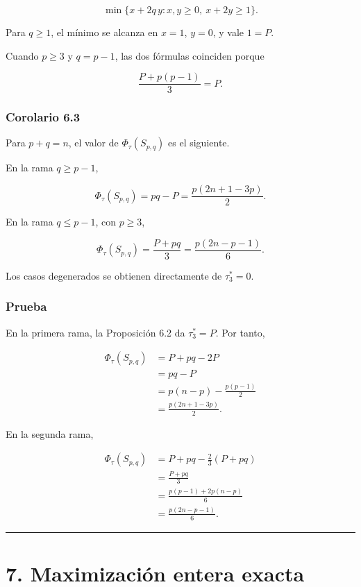 \documentclass[
  11pt,
]{article}
\begin{document}
\[
\min\{x+2q\,y:x,y\ge0,\ x+2y\ge1\}.
\]

Para \(q\ge1\), el mínimo se alcanza en \(x=1\), \(y=0\), y vale
\(1=P\).

Cuando \(p\ge3\) y \(q=p-1\), las dos fórmulas coinciden porque

\[
\frac{P+p(p-1)}{3}=P.
\]

\subsubsection{Corolario 6.3}\label{corolario-6.3}

Para \(p+q=n\), el valor de \(\Phi_\tau(S_{p,q})\) es el siguiente.

En la rama \(q\ge p-1\),

\[
\Phi_\tau(S_{p,q})
=
pq-P
=
\frac{p(2n+1-3p)}2.
\tag{6.1}
\]

En la rama \(q\le p-1\), con \(p\ge3\),

\[
\Phi_\tau(S_{p,q})
=
\frac{P+pq}{3}
=
\frac{p(2n-p-1)}6.
\tag{6.2}
\]

Los casos degenerados se obtienen directamente de \(\tau_3^*=0\).

\subsubsection{Prueba}\label{prueba-10}

En la primera rama, la Proposición 6.2 da \(\tau_3^*=P\). Por tanto,

\[
\begin{aligned}
\Phi_\tau(S_{p,q})
&=
P+pq-2P\\
&=
pq-P\\
&=
p(n-p)-\frac{p(p-1)}2\\
&=
\frac{p(2n+1-3p)}2.
\end{aligned}
\]

En la segunda rama,

\[
\begin{aligned}
\Phi_\tau(S_{p,q})
&=
P+pq-\frac23(P+pq)\\
&=
\frac{P+pq}{3}\\
&=
\frac{p(p-1)+2p(n-p)}6\\
&=
\frac{p(2n-p-1)}6.
\end{aligned}
\]

\begin{center}\rule{0.5\linewidth}{0.5pt}\end{center}

\section{7. Maximización entera
exacta}\label{maximizaciuxf3n-entera-exacta}
\end{document}
